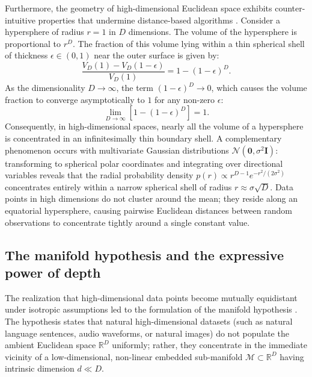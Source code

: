 \documentclass[../../main.tex]{subfiles}
\begin{document}
Furthermore, the geometry of high-dimensional Euclidean space exhibits counter-intuitive properties that undermine distance-based algorithms \citep{bishop2024deep}. Consider a hypersphere of radius $r = 1$ in $D$ dimensions. The volume of the hypersphere is proportional to $r^D$. The fraction of this volume lying within a thin spherical shell of thickness $\epsilon \in (0, 1)$ near the outer surface is given by:
\begin{equation}
\frac{V_D(1) - V_D(1 - \epsilon)}{V_D(1)} = 1 - (1 - \epsilon)^D.
\end{equation}
As the dimensionality $D \to \infty$, the term $(1 - \epsilon)^D \to 0$, which causes the volume fraction to converge asymptotically to $1$ for any non-zero $\epsilon$:
\begin{equation}
\lim_{D \to \infty} \left[ 1 - (1 - \epsilon)^D \right] = 1.
\end{equation}
Consequently, in high-dimensional spaces, nearly all the volume of a hypersphere is concentrated in an infinitesimally thin boundary shell. A complementary phenomenon occurs with multivariate Gaussian distributions $\mathcal{N}(\mathbf{0}, \sigma^2 \mathbf{I})$: transforming to spherical polar coordinates and integrating over directional variables reveals that the radial probability density $p(r) \propto r^{D-1} e^{-r^2 / (2\sigma^2)}$ concentrates entirely within a narrow spherical shell of radius $r \approx \sigma \sqrt{D}$. Data points in high dimensions do not cluster around the mean; they reside along an equatorial hypersphere, causing pairwise Euclidean distances between random observations to concentrate tightly around a single constant value.

\subsection{The manifold hypothesis and the expressive power of depth}
\label{subsec:manifold_hypothesis_depth}

The realization that high-dimensional data points become mutually equidistant under isotropic assumptions led to the formulation of the manifold hypothesis \citep{bishop2024deep,goodfellow2016}. The hypothesis states that natural high-dimensional datasets (such as natural language sentences, audio waveforms, or natural images) do not populate the ambient Euclidean space $\mathbb{R}^D$ uniformly; rather, they concentrate in the immediate vicinity of a low-dimensional, non-linear embedded sub-manifold $\mathcal{M} \subset \mathbb{R}^D$ having intrinsic dimension $d \ll D$.
\end{document}
